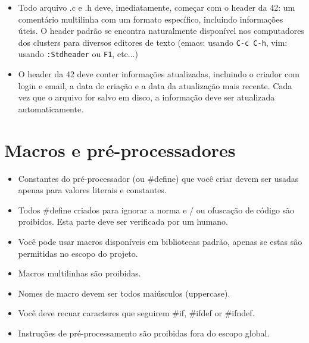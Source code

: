 \documentclass{42-pt}
\begin{document}
        \begin{itemize}

        \item Todo arquivo .c e .h deve, imediatamente, começar com o header da 42:
          um comentário multilinha com um formato específico, incluindo informações
          úteis. O header padrão se encontra naturalmente disponível nos computadores
          dos clusters para diversos editores de texto (emacs: usando \texttt{C-c C-h},
          vim: usando \texttt{:Stdheader} ou \texttt{F1}, etc...)

        \item O header da 42 deve conter informações atualizadas, incluindo o
          criador com login e email, a data de criação e a data da atualização
          mais recente. Cada vez que o arquivo for salvo em disco, a informação deve ser atualizada automaticamente.

        \end{itemize}
        \newpage
        
                
    \section{Macros e pré-processadores}

        \begin{itemize}

            \item Constantes do pré-processador (ou \#define) que você criar devem ser usadas
                apenas para valores literais e constantes.
            \item Todos \#define criados para ignorar a norma e / ou ofuscação de
                código são proibidos. Esta parte deve ser verificada por um humano.
            \item Você pode usar macros disponíveis em bibliotecas padrão, apenas
                se estas são permitidas no escopo do projeto.
            \item Macros multilinhas são proibidas.
            \item Nomes de macro devem ser todos maiúsculos (uppercase).
            \item Você deve recuar caracteres que seguirem \#if, \#ifdef
                or \#ifndef.
            \item Instruções de pré-processamento são proibidas fora do escopo global.
        \end{itemize}
        \newpage
\end{document}
